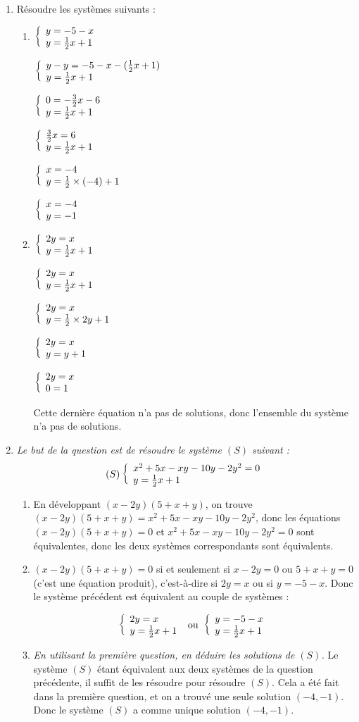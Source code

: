 \documentclass[11pt]{article}
\begin{document}
\begin{exercice}~

  \begin{enumerate}
    \item Résoudre les systèmes suivants :

      \begin{multicols}{2}
      \begin{enumerate}
      \item $\left\{\begin{array}{l}y=-5-x\\y=\frac{1}{2}x+1\end{array}\right.$

        $\left\{\begin{array}{l}y-y=-5-x-(\frac{1}{2}x+1)\\y=\frac{1}{2}x+1\end{array}\right.$

        $\left\{\begin{array}{l}0=-\frac{3}{2}x-6\\y=\frac{1}{2}x+1\end{array}\right.$

        $\left\{\begin{array}{l}\frac{3}{2}x=6\\y=\frac{1}{2}x+1\end{array}\right.$

        $\left\{\begin{array}{l}x=-4\\y=\frac{1}{2}\times(-4)+1\end{array}\right.$

        $\left\{\begin{array}{l}x=-4\\y=-1\end{array}\right.$

        \columnbreak

      \item $\left\{\begin{array}{l}2y=x\\y=\frac{1}{2}x+1\end{array}\right.$

      $\left\{\begin{array}{l}2y=x\\y=\frac{1}{2}x+1\end{array}\right.$

      $\left\{\begin{array}{l}2y=x\\y=\frac{1}{2}\times2y+1\end{array}\right.$

      $\left\{\begin{array}{l}2y=x\\y=y+1\end{array}\right.$

      $\left\{\begin{array}{l}2y=x\\0=1\end{array}\right.$

      Cette dernière équation n'a pas de solutions, donc l'ensemble du système n'a pas de solutions.
      \end{enumerate}
    \end{multicols}

  \item \emph{Le but de la question est de résoudre le système $(S)$ suivant :}
      \[(S)\left\{\begin{array}{l}x^2+5x-xy-10y-2y^2=0\\y=\frac{1}{2}x+1\end{array}\right.\]
      \begin{enumerate}
        \item En développant $(x-2y)(5+x+y)$, on trouve $(x-2y)(5+x+y)=x^2+5x-xy-10y-2y^2$, donc les équations $(x-2y)(5+x+y)=0$ et $x^2+5x-xy-10y-2y^2=0$ sont équivalentes, donc les deux systèmes correspondants sont équivalents.
        \item $(x-2y)(5+x+y)=0$ si et seulement si $x-2y=0$ ou $5+x+y=0$ (c'est une équation produit), c'est-à-dire si $2y=x$ ou si $y=-5-x$. Donc le système précédent est équivalent au couple de systèmes :

          \[\left\{\begin{array}{l}2y=x\\y=\frac{1}{2}x+1\end{array}\right. \text{ ou } \left\{\begin{array}{l}y=-5-x\\y=\frac{1}{2}x+1\end{array}\right.\]
        \item \emph{En utilisant la première question, en déduire les solutions de $(S)$.} Le système $(S)$ étant équivalent aux deux systèmes de la question précédente, il suffit de les résoudre pour résoudre $(S)$. Cela a été fait dans la première question, et on a trouvé une seule solution $(-4,-1)$. Donc le système $(S)$ a comme unique solution $(-4,-1)$.
      \end{enumerate}
  \end{enumerate}
\end{exercice}
\end{document}
